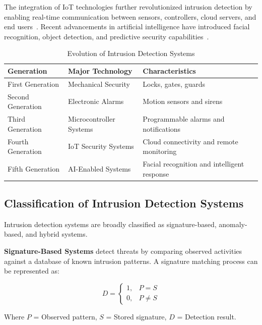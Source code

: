\documentclass[12pt,a4paper,oneside]{report}
\begin{document}
The integration of IoT technologies further revolutionized intrusion detection by enabling real-time communication between sensors, controllers, cloud servers, and end users~\cite{ref11,ref13}. Recent advancements in artificial intelligence have introduced facial recognition, object detection, and predictive security capabilities~\cite{ref16,ref21}.

\begin{table}[htbp]
  \centering
  \caption{Evolution of Intrusion Detection Systems}
  {\small
  \begin{tabular}{|p{3.50cm}|p{4.00cm}|p{6.50cm}|}
    \hline
    \textbf{Generation} & \textbf{Major Technology} & \textbf{Characteristics} \\
    \hline
    First Generation  & Mechanical Security       & Locks, gates, guards \\
    Second Generation & Electronic Alarms         & Motion sensors and sirens \\
    Third Generation  & Microcontroller Systems   & Programmable alarms and notifications \\
    Fourth Generation & IoT Security Systems      & Cloud connectivity and remote monitoring \\
    Fifth Generation  & AI-Enabled Systems        & Facial recognition and intelligent response \\
    \hline
  \end{tabular}
  }
\end{table}

\subsection{Classification of Intrusion Detection Systems}

Intrusion detection systems are broadly classified as signature-based, anomaly-based, and hybrid systems.

\textbf{Signature-Based Systems} detect threats by comparing observed activities against a database of known intrusion patterns. A signature matching process can be represented as:

\begin{equation}
  D = \begin{cases} 1, & P = S \\ 0, & P \neq S \end{cases}
\end{equation}

Where $P$ = Observed pattern, $S$ = Stored signature, $D$ = Detection result.
\end{document}
